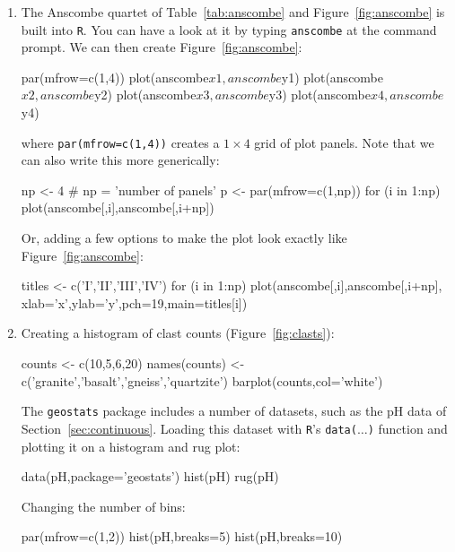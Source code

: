\begin{enumerate}

\item\label{it:anscombe} The Anscombe quartet of
  Table~\ref{tab:anscombe} and Figure~\ref{fig:anscombe} is built into
  \texttt{R}. You can have a look at it by typing \texttt{anscombe} at
  the command prompt. We can then create Figure~\ref{fig:anscombe}:

\begin{script}
par(mfrow=c(1,4))
plot(anscombe$x1,anscombe$y1)
plot(anscombe$x2,anscombe$y2)
plot(anscombe$x3,anscombe$y3)
plot(anscombe$x4,anscombe$y4)
\end{script}

\noindent where \texttt{par(mfrow=c(1,4))} creates a $1\times{4}$ grid
of plot panels. Note that we can also write this more generically:

\begin{script}
np <- 4 # np = 'number of panels'
p <- par(mfrow=c(1,np))
for (i in 1:np){
  plot(anscombe[,i],anscombe[,i+np])
}
\end{script}

Or, adding a few options to make the plot look exactly like
Figure~\ref{fig:anscombe}:

\begin{script}[firstnumber=3]
titles <- c('I','II','III','IV')
for (i in 1:np){
  plot(anscombe[,i],anscombe[,i+np],
       xlab='x',ylab='y',pch=19,main=titles[i])
}
\end{script}

\item Creating a histogram of clast counts (Figure~\ref{fig:clasts}):

\begin{script}
counts <- c(10,5,6,20)
names(counts) <- c('granite','basalt','gneiss','quartzite')
barplot(counts,col='white')
\end{script}

The \texttt{geostats} package includes a number of datasets, such as
the pH data of Section~\ref{sec:continuous}. Loading this dataset with
\texttt{R}'s \texttt{data($\ldots$)} function and plotting it on a
histogram and rug plot:

\begin{script}
data(pH,package='geostats')
hist(pH)
rug(pH)
\end{script}

Changing the number of bins:

\begin{script}[firstnumber=2]
par(mfrow=c(1,2))
hist(pH,breaks=5)
hist(pH,breaks=10)
\end{script}


\end{enumerate}
